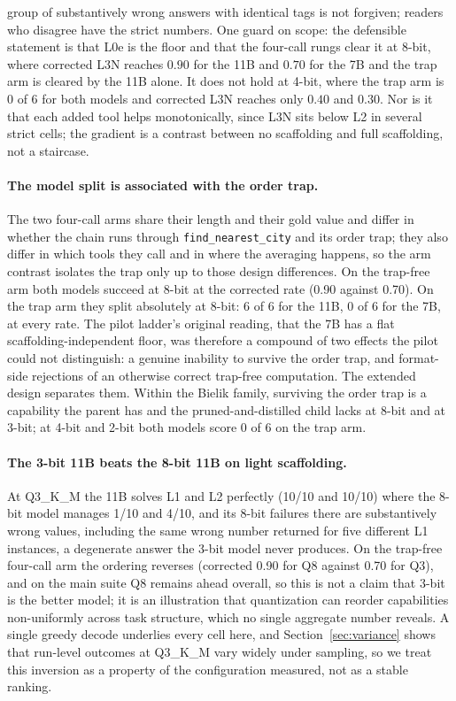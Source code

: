 \documentclass[11pt]{article}
\begin{document}
group of substantively wrong answers with identical tags is not forgiven; readers who disagree have the strict numbers. One guard on scope: the defensible statement is that L0e is the floor and that the four-call rungs clear it at 8-bit, where corrected L3N reaches $0.90$ for the 11B and $0.70$ for the 7B and the trap arm is cleared by the 11B alone. It does not hold at 4-bit, where the trap arm is 0 of 6 for both models and corrected L3N reaches only $0.40$ and $0.30$. Nor is it that each added tool helps monotonically, since L3N sits below L2 in several strict cells; the gradient is a contrast between no scaffolding and full scaffolding, not a staircase.

\paragraph{The model split is associated with the order trap.} The two four-call arms share their length and their gold value and differ in whether the chain runs through \texttt{find\_\allowbreak{}nearest\_\allowbreak{}city} and its order trap; they also differ in which tools they call and in where the averaging happens, so the arm contrast isolates the trap only up to those design differences. On the trap-free arm both models succeed at 8-bit at the corrected rate (0.90 against 0.70). On the trap arm they split absolutely at 8-bit: 6 of 6 for the 11B, 0 of 6 for the 7B, at every rate. The pilot ladder's original reading, that the 7B has a flat scaffolding-independent floor, was therefore a compound of two effects the pilot could not distinguish: a genuine inability to survive the order trap, and format-side rejections of an otherwise correct trap-free computation. The extended design separates them. Within the Bielik family, surviving the order trap is a capability the parent has and the pruned-and-distilled child lacks at 8-bit and at 3-bit; at 4-bit and 2-bit both models score 0 of 6 on the trap arm.

\paragraph{The 3-bit 11B beats the 8-bit 11B on light scaffolding.} At Q3\_K\_M the 11B solves L1 and L2 perfectly (10/10 and 10/10) where the 8-bit model manages 1/10 and 4/10, and its 8-bit failures there are substantively wrong values, including the same wrong number returned for five different L1 instances, a degenerate answer the 3-bit model never produces. On the trap-free four-call arm the ordering reverses (corrected 0.90 for Q8 against 0.70 for Q3), and on the main suite Q8 remains ahead overall, so this is not a claim that 3-bit is the better model; it is an illustration that quantization can reorder capabilities non-uniformly across task structure, which no single aggregate number reveals. A single greedy decode underlies every cell here, and Section~\ref{sec:variance} shows that run-level outcomes at Q3\_K\_M vary widely under sampling, so we treat this inversion as a property of the configuration measured, not as a stable ranking.
\end{document}
